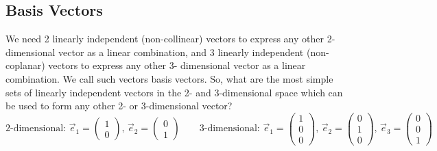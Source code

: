 \documentclass[12pt,eng]{skript_ogg}
\begin{document}
\subsection{Basis Vectors}
We need 2 linearly independent (non-collinear) vectors to express any other 2-dimensional vector as a linear combination, and 3 linearly independent (non-coplanar) vectors to express any other 3- dimensional vector as a linear combination. We call such vectors basis vectors. So, what are the most simple sets of linearly independent vectors in the 2- and 3-dimensional space which can be used to form any other 2- or 3-dimensional vector?
\[\mbox{2-dimensional: }\vec{e}_1=\begin{pmatrix}1\\0
\end{pmatrix},\,\vec{e}_2=\begin{pmatrix}0\\1
\end{pmatrix}\qquad\mbox{3-dimensional: }\vec{e}_1=\begin{pmatrix}1\\0\\0
\end{pmatrix},\,\vec{e}_2=\begin{pmatrix}0\\1\\0
\end{pmatrix},\,\vec{e}_3=\begin{pmatrix}0\\0\\1
\end{pmatrix}\]
\end{document}
